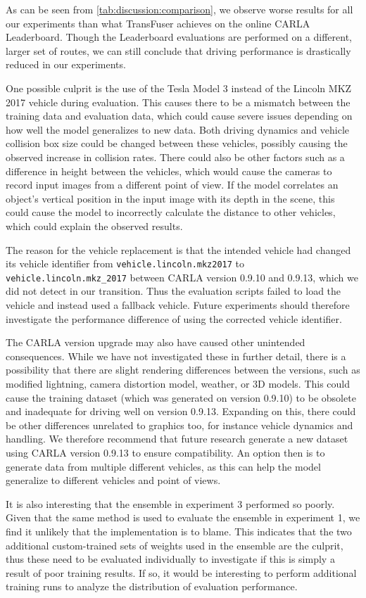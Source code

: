 As can be seen from \cref{tab:discussion:comparison},
we observe worse results for all our experiments
than what TransFuser achieves on the online CARLA Leaderboard.
Though the Leaderboard evaluations are performed on a different, larger set of routes,
we can still conclude that driving performance is drastically reduced in our experiments.

One possible culprit is the use of the Tesla Model 3 instead of the Lincoln MKZ 2017 vehicle during evaluation.
This causes there to be a mismatch between the training data and evaluation data,
which could cause severe issues depending on how well the model generalizes to new data.
Both driving dynamics and vehicle collision box size could be changed between these vehicles,
possibly causing the observed increase in collision rates.
There could also be other factors such as a difference in height between the vehicles,
which would cause the cameras to record input images from a different point of view.
If the model correlates an object's vertical position in the input image
with its depth in the scene,
this could cause the model to incorrectly calculate the distance to other vehicles,
which could explain the observed results.

The reason for the vehicle replacement is that the intended vehicle
had changed its vehicle identifier
from \texttt{vehicle.lincoln.mkz2017}
to \texttt{vehicle.lincoln.mkz\_2017}
between CARLA version 0.9.10 and 0.9.13,
which we did not detect in our transition.
Thus the evaluation scripts failed to load the vehicle and instead used a fallback vehicle.
Future experiments should therefore investigate the performance difference of using the corrected vehicle identifier.

The CARLA version upgrade may also have caused other unintended consequences.
While we have not investigated these in further detail,
there is a possibility that there are slight rendering differences between the versions,
such as modified lightning, camera distortion model, weather, or 3D models.
This could cause the training dataset (which was generated on version 0.9.10)
to be obsolete and inadequate for driving well on version 0.9.13.
Expanding on this,
there could be other differences unrelated to graphics too,
for instance vehicle dynamics and handling.
We therefore recommend that future research generate a new dataset using CARLA version 0.9.13
to ensure compatibility.
An option then is to generate data from multiple different vehicles,
as this can help the model generalize to different vehicles and point of views.

It is also interesting that the ensemble in experiment 3 performed so poorly.
Given that the same method is used to evaluate the ensemble in experiment 1,
we find it unlikely that the implementation is to blame.
This indicates that the two additional custom-trained sets of weights used in the ensemble are the culprit,
thus these need to be evaluated individually to investigate if this is simply a result of poor training results.
If so, it would be interesting to perform additional training runs
to analyze the distribution of evaluation performance.


